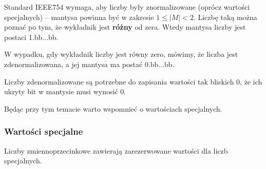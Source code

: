 Standard IEEE754 wymaga, aby liczby były znormalizowane (oprócz wartości specjalnych) -- mantysa powinna być w zakresie $1 \le |M| < 2$. Liczbę taką można poznać po tym, że wykładnik jest \textbf{różny} od zera. Wtedy mantysa liczby jest postaci 1.bb...bb.

W wypadku, gdy wykładnik liczby jest równy zero, mówimy, że liczba jest zdenormalizowana, a jej mantysa ma postać 0.bb...bb.

Liczby zdenormalizowane są potrzebne do zapisania wartości tak bliskich 0, że ich ukryty bit w mantysie musi wynosić 0.

Będąc przy tym temacie warto wspomnieć o wartościach specjalnych.

\subsubsection{Wartości specjalne}


Liczby zmiennoprzecinkowe zawierają zarezerwowane wartości dla liczb specjalnych.

